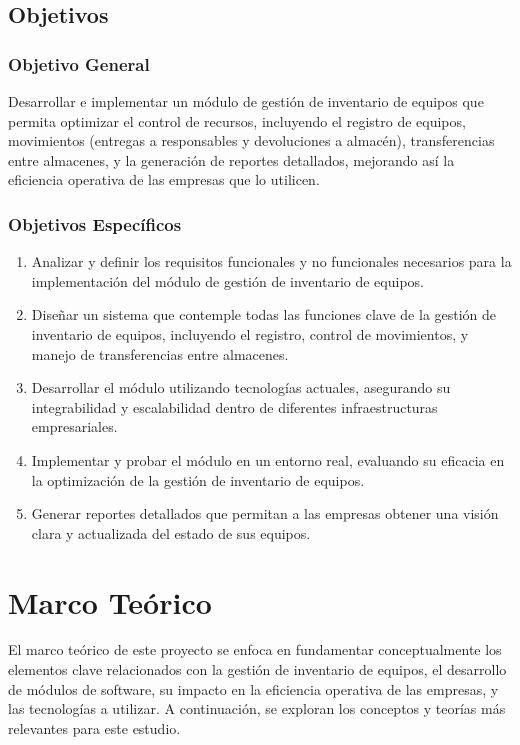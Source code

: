 \documentclass[stu, 12pt, letterpaper, donotrepeattitle, floatsintext, natbib]{apa7}
\begin{document}
\subsection{Objetivos}
\subsubsection{Objetivo General}
Desarrollar e implementar un módulo de gestión de inventario de equipos que permita optimizar el control de recursos, incluyendo el registro
de equipos, movimientos (entregas a responsables y devoluciones a almacén), transferencias entre almacenes, y la generación de reportes
detallados, mejorando así la eficiencia operativa de las empresas que lo utilicen.
\subsubsection{Objetivos Específicos}
\begin{enumerate}
    \item Analizar y definir los requisitos funcionales y no funcionales necesarios para la implementación del módulo de gestión de inventario
          de equipos.
    \item Diseñar un sistema que contemple todas las funciones clave de la gestión de inventario de equipos, incluyendo el registro, control
          de movimientos, y manejo de transferencias entre almacenes.
    \item Desarrollar el módulo utilizando tecnologías actuales, asegurando su integrabilidad y escalabilidad dentro de diferentes
          infraestructuras empresariales.
    \item Implementar y probar el módulo en un entorno real, evaluando su eficacia en la optimización de la gestión de inventario de equipos.
    \item Generar reportes detallados que permitan a las empresas obtener una visión clara y actualizada del estado de sus equipos.
\end{enumerate}
\newpage
\section{Marco Teórico}
El marco teórico de este proyecto se enfoca en fundamentar conceptualmente los elementos clave relacionados con la gestión de inventario de
equipos, el desarrollo de módulos de software, su impacto en la eficiencia operativa de las empresas, y las tecnologías a utilizar. A
continuación, se exploran los conceptos y teorías más relevantes para este estudio.
\end{document}
